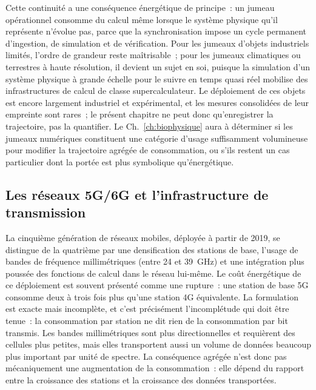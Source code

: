 %
Cette continuité a une conséquence énergétique de principe~: un jumeau opérationnel consomme du calcul même lorsque le système physique qu'il représente n'évolue pas, parce que la synchronisation impose un cycle permanent d'ingestion, de simulation et de vérification. Pour les jumeaux d'objets industriels limités, l'ordre de grandeur reste maîtrisable~; pour les jumeaux climatiques ou terrestres à haute résolution, il devient un sujet en soi, puisque la simulation d'un système physique à grande échelle pour le suivre en temps quasi réel mobilise des infrastructures de calcul de classe supercalculateur. Le déploiement de ces objets est encore largement industriel et expérimental, et les mesures consolidées de leur empreinte sont rares~; le présent chapitre ne peut donc qu'enregistrer la trajectoire, pas la quantifier. Le Ch.~\ref{ch:biophysique} aura à déterminer si les jumeaux numériques constituent une catégorie d'usage suffisamment volumineuse pour modifier la trajectoire agrégée de consommation, ou s'ils restent un cas particulier dont la portée est plus symbolique qu'énergétique.


\subsection{Les réseaux 5G/6G et l'infrastructure de transmission}\label{subsec:5g}

%
La cinquième génération de réseaux mobiles, déployée à partir de 2019, se distingue de la quatrième par une densification des stations de base, l'usage de bandes de fréquence millimétriques (entre 24 et 39~GHz) et une intégration plus poussée des fonctions de calcul dans le réseau lui-même. Le coût énergétique de ce déploiement est souvent présenté comme une rupture~: une station de base 5G consomme deux à trois fois plus qu'une station 4G équivalente. La formulation est exacte mais incomplète, et c'est précisément l'incomplétude qui doit être tenue~: la consommation par station ne dit rien de la consommation par bit transmis. Les bandes millimétriques sont plus directionnelles et requièrent des cellules plus petites, mais elles transportent aussi un volume de données beaucoup plus important par unité de spectre. La conséquence agrégée n'est donc pas mécaniquement une augmentation de la consommation~: elle dépend du rapport entre la croissance des stations et la croissance des données transportées.

